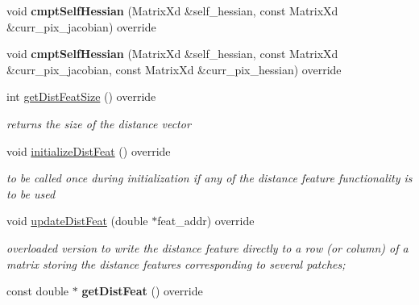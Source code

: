\begin{DoxyCompactItemize}
\item 
\hypertarget{classSPSS_a038ab8816635470f35348b12441d292c}{void {\bfseries cmpt\-Self\-Hessian} (Matrix\-Xd \&self\-\_\-hessian, const Matrix\-Xd \&curr\-\_\-pix\-\_\-jacobian) override}\label{classSPSS_a038ab8816635470f35348b12441d292c}

\item 
\hypertarget{classSPSS_a6738779398425642188751929b9233ad}{void {\bfseries cmpt\-Self\-Hessian} (Matrix\-Xd \&self\-\_\-hessian, const Matrix\-Xd \&curr\-\_\-pix\-\_\-jacobian, const Matrix\-Xd \&curr\-\_\-pix\-\_\-hessian) override}\label{classSPSS_a6738779398425642188751929b9233ad}

\item 
\hypertarget{classSPSS_a1ef044f77c46aa50028ee18a84fbc4c2}{int \hyperlink{classSPSS_a1ef044f77c46aa50028ee18a84fbc4c2}{get\-Dist\-Feat\-Size} () override}\label{classSPSS_a1ef044f77c46aa50028ee18a84fbc4c2}

\begin{DoxyCompactList}\small\item\em returns the size of the distance vector \end{DoxyCompactList}\item 
\hypertarget{classSPSS_acfc0b3c6bccb7cf884ed8a5d4a3d7137}{void \hyperlink{classSPSS_acfc0b3c6bccb7cf884ed8a5d4a3d7137}{initialize\-Dist\-Feat} () override}\label{classSPSS_acfc0b3c6bccb7cf884ed8a5d4a3d7137}

\begin{DoxyCompactList}\small\item\em to be called once during initialization if any of the distance feature functionality is to be used \end{DoxyCompactList}\item 
\hypertarget{classSPSS_aa47eee19db38d35acde009defbcbcb79}{void \hyperlink{classSPSS_aa47eee19db38d35acde009defbcbcb79}{update\-Dist\-Feat} (double $\ast$feat\-\_\-addr) override}\label{classSPSS_aa47eee19db38d35acde009defbcbcb79}

\begin{DoxyCompactList}\small\item\em overloaded version to write the distance feature directly to a row (or column) of a matrix storing the distance features corresponding to several patches; \end{DoxyCompactList}\item 
\hypertarget{classSPSS_aca27088df6e11a8b358ead5a5af73390}{const double $\ast$ {\bfseries get\-Dist\-Feat} () override}\label{classSPSS_aca27088df6e11a8b358ead5a5af73390}


\end{DoxyCompactItemize}
